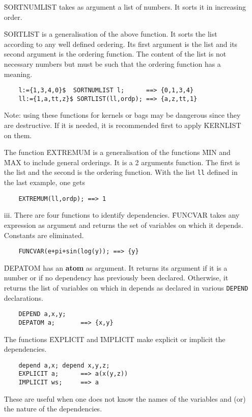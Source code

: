 \begin{itemize}
\f{SORTNUMLIST} takes as argument a list of numbers. It sorts it in
increasing order.

\f{SORTLIST} is a generalisation of the above function.
It sorts the list according
to any well defined ordering.  Its first argument is the list and its
second argument is the ordering function.  The content of the list
is not necessary numbers but must be such that the ordering function has
a meaning.
\begin{verbatim}
	l:={1,3,4,0}$  SORTNUMLIST l;      ==> {0,1,3,4}
	ll:={1,a,tt,z}$ SORTLIST(ll,ordp); ==> {a,z,tt,1}
\end{verbatim}
Note: using these functions for kernels or bags may be
dangerous since they are destructive. If it is needed, it is recommended
first to apply \f{KERNLIST} on them.

The function \f{EXTREMUM} is a generalisation of the
functions \f{MIN} and \f{MAX} to include general orderings.  It is a 2
arguments function.
The first is the list and the second is the ordering function.
With the list \verb+ll+ defined in the last example, one gets
\begin{verbatim}
	EXTREMUM(ll,ordp); ==> 1
\end{verbatim}
\item[iii.] There are four functions to identify dependencies.
\f{FUNCVAR} takes any expression as argument and
returns the set of variables on which it depends. Constants are eliminated.
\begin{verbatim}
	FUNCVAR(e+pi+sin(log(y)); ==> {y}
\end{verbatim}
\f{DEPATOM} has an {\bf atom} as argument.  It returns
its argument if it is
a number or if no dependency has previously been declared.  Otherwise,
it returns the list of variables on which in depends as declared in
various {\tt DEPEND} declarations.
\begin{verbatim}
	DEPEND a,x,y;
	DEPATOM a;       ==> {x,y}
\end{verbatim}
The functions \f{EXPLICIT} and
\f{IMPLICIT} make explicit or
implicit the dependencies.
\begin{verbatim}
	depend a,x; depend x,y,z;
	EXPLICIT a;      ==> a(x(y,z))
	IMPLICIT ws;     ==> a
\end{verbatim}
These are useful when one does not know the names of the variables
and (or) the nature of the dependencies.


\end{itemize}

